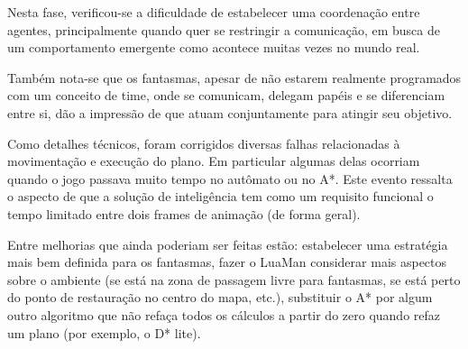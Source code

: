 \documentclass[a4paper]{scrartcl}
\begin{document}
Nesta fase, verificou-se a dificuldade de estabelecer uma coordenação entre agentes,
principalmente quando quer se restringir a comunicação, em busca de um comportamento emergente
como acontece muitas vezes no mundo real.

Também nota-se que os fantasmas, apesar de não estarem realmente programados com um conceito de time,
onde se comunicam, delegam papéis e se diferenciam entre si, dão a impressão de que atuam conjuntamente
para atingir seu objetivo.

Como detalhes técnicos, foram corrigidos diversas falhas relacionadas à movimentação e execução do plano.
Em particular algumas delas ocorriam quando o jogo passava muito tempo no autômato ou no A*. Este evento
ressalta o aspecto de que a solução de inteligência tem como um requisito funcional o tempo limitado
entre dois frames de animação (de forma geral).

Entre melhorias que ainda poderiam ser feitas estão: estabelecer uma estratégia mais bem definida para os fantasmas,
fazer o LuaMan considerar mais aspectos sobre o ambiente (se está na zona de passagem livre para fantasmas, se está perto
do ponto de restauração no centro do mapa, etc.), substituir o A* por algum outro algoritmo que não refaça todos os cálculos
a partir do zero quando refaz um plano (por exemplo, o D* lite).
\end{document}
